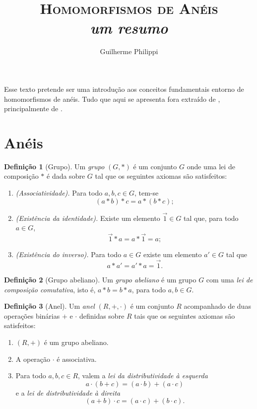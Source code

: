 \documentclass[a4paper,12pt]{article}
\title{\textsc{Homomorfismos de Anéis}\\ \textsl{um resumo}}
\author{Guilherme Philippi}
\theoremstyle{plain}
\theoremstyle{definition}
\newtheorem{definicao}{Definição}[section]
\begin{document}
	\maketitle
	
	Esse texto pretende ser uma introdução aos conceitos fundamentais entorno de homomorfismos de anéis. Tudo que aqui se apresenta fora extraído de \cite{johnAlgebra, michalAlgebra, dominguesAlgebra}, principalmente de \cite{dominguesAlgebra}.
	
	\section{Anéis}
	
	\begin{definicao}[Grupo]
		Um \emph{grupo} $(G,*)$ é um conjunto \(G\) onde uma lei de
		composição $*$ é dada sobre \(G\) tal que os seguintes axiomas são satisfeitos:
		
		\begin{enumerate}
			\item \emph{(Associatividade).} Para todo $a,b,c \in G$, tem-se $$(a*b)*c = a*(b*c);$$
			\item \emph{(Existência da identidade).} Existe um elemento $\vec{1}\in G$ tal que, para todo $a\in G$, $$\vec{1}*a = a*\vec{1} = a;$$
			\item \emph{(Existência do inverso).} Para todo $a\in G$ existe um elemento $a'\in G$ tal que $$a*a' = a'*a = \vec{1}.$$
		\end{enumerate}
	\end{definicao}
	
	\begin{definicao}[Grupo abeliano]
		Um \emph{grupo abeliano} é um grupo $G$ com uma \emph{lei de
		composição comutativa}, isto é, $a*b = b*a$, para todo $a,b \in G$.
	\end{definicao}
	
	\begin{definicao}[Anel]
		Um \emph{anel} $(R, +, \cdot)$ é um conjunto $R$ acompanhado de duas operações binárias $+$ e $\cdot$ definidas sobre $R$ tais que os seguintes axiomas são satisfeitos:
		\begin{enumerate}
			\item $(R, +)$ é um grupo abeliano.
			\item A operação $\cdot$ é associativa.
			\item Para todo $a,b,c\in R$, valem a \emph{lei da distributividade à esquerda} $$a\cdot(b+c) = (a\cdot b) + (a\cdot c)$$ e a \emph{lei de distributividade à direita} $$(a+b)\cdot c = (a\cdot c) + (b\cdot c).$$
		\end{enumerate}
	\end{definicao}
	
\end{document}
